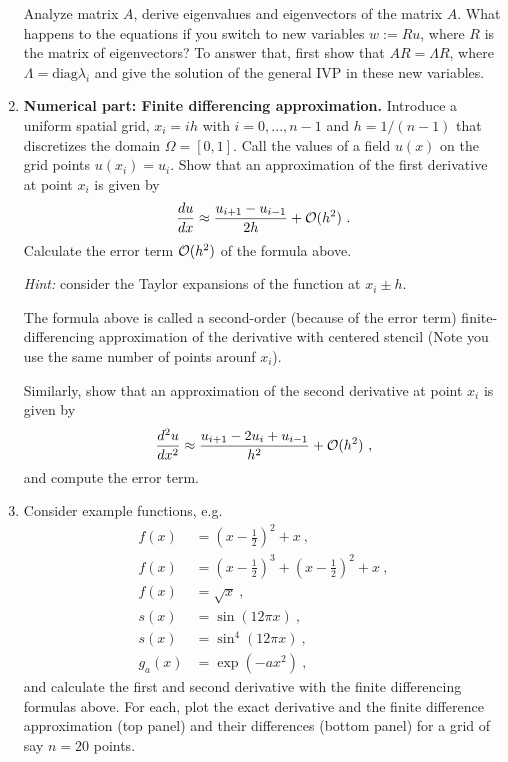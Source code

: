 \documentclass[11pt,a4paper,headinclude=true,DIV=14,BCOR=8mm,chapterprefix,listof=totoc,twoside,openright,abstracton]{scrbook}
\begin{document}
\begin{enumerate}
    Analyze matrix $A$, derive eigenvalues and eigenvectors of the
    matrix $A$. What happens to the equations if you switch to new variables $w := Ru$,
    where $R$ is the matrix of eigenvectors? To answer that, first show that $AR = \Lambda R$, where
    $\Lambda={\text{diag}}{\lambda_i}$ and give the solution of the general IVP in these new variables.
  \item {\textbf{Numerical part: Finite differencing approximation.}} Introduce a uniform spatial grid, $x_i = i h $ with
    $i=0,...,n-1$ and $h=1/(n-1)$ that
    discretizes the domain $\Omega=[0,1]$. Call the values of a field
    $u(x)$ on the grid points $u(x_i)=u_i$. Show that an approximation
    of the first derivative at point $x_i$ is given by
    \begin{equation}
      \frac{du}{dx}\approx \frac{u_{i+1}-u_{i-1}}{2h}
      + {\cal O}(h^2) \ . 
    \end{equation}
    Calculate the error term ${\cal O}(h^2)$ of the formula above.

    {\textit{Hint:}} consider the Taylor expansions of the function at
    $x_i\pm h$.

    The formula above is called a second-order (because of the error
    term) finite-differencing
    approximation of the derivative with centered stencil (Note you
    use the same number of points arounf $x_i$).

    Similarly, show that an approximation
    of the second derivative at point $x_i$ is given by
    \begin{equation}
      \frac{d^2u}{dx^2}\approx \frac{u_{i+1}-2u_{i}+u_{i-1}}{h^2}
      + {\cal O}(h^2) \ ,  
    \end{equation}
    and compute the error term.
  \item Consider example functions, e.g.
    \begin{align}
      f(x) &= (x-\frac{1}{2})^2 + x   \ ,\\
      f(x) &= (x-\frac{1}{2})^3 + (x-\frac{1}{2})^2 + x   \ ,\\
      f(x) &= \sqrt{x}  \ ,\\
      s(x) &= \sin{(12\pi x)}  \ ,\\
      s(x) &= \sin^4{(12\pi x)}  \ ,\\
      g_a(x) &= \exp{(- a x^2)}  \ ,
    \end{align}
    and calculate the first and second derivative with the finite
    differencing formulas
    above. For each, plot the exact derivative and the finite
    difference approximation (top panel) and their differences (bottom
    panel) for a grid of say $n=20$ points.


\end{enumerate}
\end{document}
